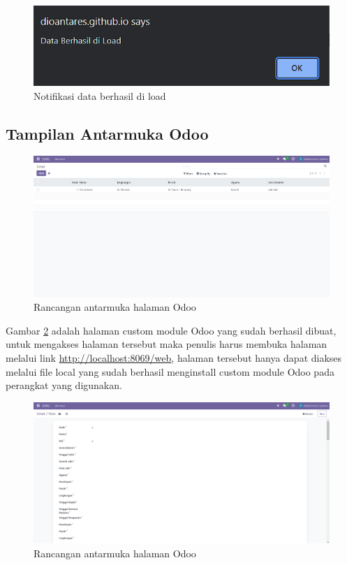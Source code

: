 \begin{figure}[H]
	\centering
	\includegraphics[scale=0.7]{Gambar/loadBerhasil.png}
	\caption{Notifikasi data berhasil di load} 
	\label{fig:loadBerhasil}
\end{figure}

\subsection{Tampilan Antarmuka Odoo}
\label{sec:tampilanAntarmukaOdoo}

\begin{figure}[H]
	\centering
	\includegraphics[scale=0.4]{Gambar/odooBuatBaru.png}
	\caption{Rancangan antarmuka halaman Odoo} 
	\label{fig:odooBuatBaru}
\end{figure}

Gambar \ref{fig:odooBuatBaru} adalah halaman custom module Odoo yang sudah berhasil dibuat, untuk mengakses halaman tersebut maka penulis harus membuka halaman melalui link \url{http://localhost:8069/web}, halaman tersebut hanya dapat diakses melalui file local yang sudah berhasil menginstall custom module Odoo pada perangkat yang digunakan.

\begin{figure}[H]
	\centering
	\includegraphics[scale=0.4]{Gambar/odooBuatBaru2.png}
	\caption{Rancangan antarmuka halaman Odoo} 
	\label{fig:odooBuatBaru2}
\end{figure}

